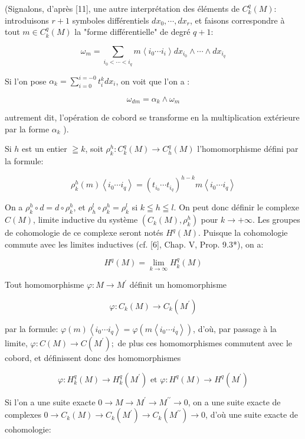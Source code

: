 (Signalons, d'après [11], une autre interprétation des éléments de $C_{k}^{q}(M):$ introduisons $r+1$ symboles différentiels $d x_{0}, \cdots, d x_{r}$, et faisons correspondre à tout $m \in C_{k}^{q}(M)$ la "forme différentielle" de degré $q+1:$

$$
\omega_{m}=\sum_{i_{0}<\cdots<i_{q}} m\left\langle i_{0} \cdots i_{i}\right\rangle d x_{i_{0}} \wedge \cdots \wedge d x_{i_{q}}
$$

Si l'on pose $\alpha_{k}=\sum_{i=0}^{i=-0} t_{i}^{k} d x_{i}$, on voit que l'on a :

$$
\omega_{d m}=\alpha_{k} \wedge \omega_{m}
$$

autrement dit, l'opération de cobord se transforme en la multiplication extérieure par la forme $\alpha_{k}$ ).

Si $h$ est un entier $\geqq k$, soit $\rho_{k}^{h}: C_{k}^{q}(M) \rightarrow C_{h}^{q}(M)$ l'homomorphisme défini par la formule:

$$
\rho_{k}^{h}(m)\left\langle i_{0} \cdots i_{q}\right\rangle=\left(t_{i_{0}} \cdots t_{i_{q}}\right)^{h-k} m\left\langle i_{0} \cdots i_{q}\right\rangle
$$

On a $\rho_{k}^{h} \circ d=d \circ \rho_{k}^{h}$, et $\rho_{h}^{l} \circ \rho_{k}^{h}=\rho_{k}^{l}$ si $k \leqq h \leqq l .$ On peut donc définir le complexe $C(M)$, limite inductive du système $\left(C_{k}(M), \rho_{k}^{h}\right)$ pour $k \rightarrow+\infty .$ Les groupes de cohomologie de ce complexe seront notés $H^{q}(M) .$ Puisque la cohomologie commute avec les limites inductives (cf. [6], Chap. V, Prop. 9.3*), on a:

$$
H^{q}(M)=\lim _{k \rightarrow \infty} H_{k}^{q}(M)
$$

Tout homomorphisme $\varphi: M \rightarrow M^{\prime}$ définit un homomorphisme

$$
\varphi: C_{k}(M) \rightarrow C_{k}\left(M^{\prime}\right)
$$

par la formule: $\varphi(m)\left\langle i_{0} \cdots i_{q}\right\rangle=\varphi\left(m\left\langle i_{0} \cdots i_{q}\right\rangle\right)$, d'où, par passage à la limite, $\varphi: C(M) \rightarrow C\left(M^{\prime}\right) ;$ de plus ces homomorphismes commutent avec le cobord, et définissent donc des homomorphismes

$$
\varphi: H_{k}^{q}(M) \rightarrow H_{k}^{q}\left(M^{\prime}\right) \text { et } \varphi: H^{q}(M) \rightarrow H^{q}\left(M^{\prime}\right)
$$

Si l'on a une suite exacte $0 \rightarrow M \rightarrow M^{\prime} \rightarrow M^{\prime \prime} \rightarrow 0$, on a une suite exacte de complexes $0 \rightarrow C_{k}(M) \rightarrow C_{k}\left(M^{\prime}\right) \rightarrow C_{k}\left(M^{\prime \prime}\right) \rightarrow 0$, d'où une suite exacte de cohomologie:


